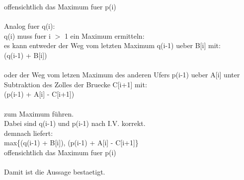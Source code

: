\documentclass{article}
\begin{document}
offensichtlich das Maximum fuer p(i)\\
\\
Analog fuer q(i):\\
q(i) muss fuer i $>$ 1 ein Maximum ermitteln:\\
es kann entweder der Weg vom letzten Maximum q(i-1) ueber
B[i] mit:\\
(q(i-1) + B[i])\\
\\
oder der Weg vom letzen Maximum des anderen Ufers p(i-1) ueber
A[i] unter Subtraktion des Zolles der Bruecke C[i+1] mit:\\
(p(i-1) + A[i] - C[i+1])\\
\\
zum Maximum führen.\\
Dabei sind q(i-1) und p(i-1) nach I.V. korrekt.\\
demnach liefert:\\
max\{(q(i-1) + B[i]), (p(i-1) + A[i] - C[i+1]\}\\
offensichtlich das Maximum fuer p(i)\\
\\
Damit ist die Aussage bestaetigt.
\end{document}
